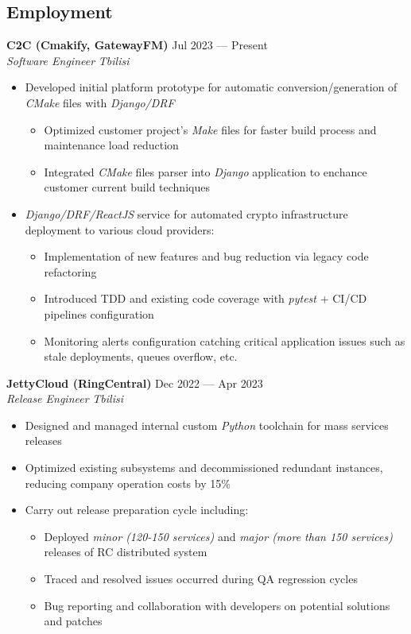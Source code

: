 \documentclass[10pt]{report}
\newenvironment{JobDescription}[5]{
    \vspace{ #5 }
    \flushleft
    {\bf #1 } \hfill { #2 }
    \\
    {\em #3 } \hfill {\em #4 }
    \begin{itemize}
} {
    \end{itemize}
}
\begin{document}
\subsection*{Employment}
\begin{JobDescription}{C2C (Cmakify, GatewayFM)}{Jul 2023 --- Present}{Software Engineer}{Tbilisi}{2mm}
    \item Developed initial platform prototype for automatic conversion/generation of \emph{CMake} files with
        \emph{Django/DRF}
    \begin{itemize}
        \item Optimized customer project's \emph{Make} files for faster build process and maintenance load reduction
        \item Integrated \emph{CMake} files parser into \emph{Django} application to enchance customer current build techniques
    \end{itemize}
    \item \emph{Django/DRF/ReactJS} service for automated crypto infrastructure deployment to various cloud providers:
    \begin{itemize}
        \item Implementation of new features and bug reduction via legacy code refactoring
        \item Introduced TDD and existing code coverage with \emph{pytest} + CI/CD pipelines configuration
        \item Monitoring alerts configuration catching critical application issues such as stale deployments, queues
            overflow, etc.
    \end{itemize}
\end{JobDescription}

\begin{JobDescription}{JettyCloud (RingCentral)}{Dec 2022 --- Apr 2023}{Release Engineer}{Tbilisi}{2mm}
    \item Designed and managed internal custom \emph{Python} toolchain for mass services releases
    \item Optimized existing subsystems and decommissioned redundant instances, reducing company operation costs by 15\%
    \item Carry out release preparation cycle including:
    \begin{itemize}
        \item Deployed \emph{minor (120-150 services)} and \emph{major (more than 150 services)} releases of RC distributed system
        \item Traced and resolved issues occurred during QA regression cycles
        \item Bug reporting and collaboration with developers on potential solutions and patches
    \end{itemize}
\end{JobDescription}
\end{document}
